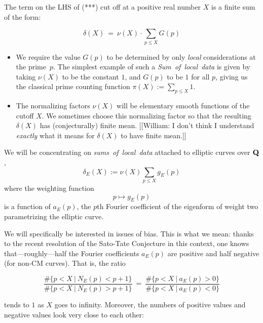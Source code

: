 \documentclass[11pt]{article}
\theoremstyle{plain}
\theoremstyle{definition}
\numberwithin{equation}{section}
\numberwithin{figure}{section}
\numberwithin{table}{section}
\def\Q{\bf{Q}}
\begin{document}
The term on the LHS of {(***)}  cut off at a positive real number $X$ is  a finite sum of the form:

  $$\delta(X) \ = \ \nu(X)\cdot \sum_{p\le X}G(p)$$



  \begin{itemize} \item We require the value $G(p)$ to be determined by only {\it local }considerations at the prime~$p$.
The simplest example of such a {\it Sum\ of\ local\ data}  is given by taking $\nu(X)$ to be the constant $1$, and  $G(p)$ to be  $1$ for all $p$, giving us the classical prime counting function $\pi(X):=\sum_{p\le X}1$. \item The normalizing factors $\nu(X)$ will be elementary smooth functions of the cutoff $X$. We sometimes choose this normalizing factor so that the  resulting  $\delta(X)$ has (conjecturally) finite mean. [[William: I don't think I understand {\em exactly} what it means for $\delta(X)$ to have finite mean.]]

\end{itemize}

We will be concentrating on  {\it sums\ of\ local\ data}  attached to elliptic curves over ${\Q}$,   $$\delta_E(X):=\nu(X)\sum_{p\le X}g_E(p)$$ where the weighting function $$p \mapsto g_E(p)$$   is a function of $a_E(p)$, the $p$th Fourier coefficient of the eigenform of weight two parametrizing the elliptic curve.

  We will specifically be interested in  issues of bias. This is what we mean: thanks to the recent resolution \cite{} of the Sato-Tate Conjecture in this context, one knows that---roughly---half the Fourier coefficients  $a_E(p)$ are positive and half negative (for non-CM curves). That is,  the ratio

 $${\frac{\#\{p < X \ | \ N_E(p) < p+1 \}} {\#\{p < X \ | \ N_E(p) > p+1 \}}}\ =\ {\frac{\#\{p < X \ | \ a_E(p) > 0 \}} {\#\{p < X \ | \ a_E(p) < 0 \}}}$$

 tends to $1$ as $X$ goes to infinity. Moreover, the numbers of positive values and negative values look very close to each other:
\vskip20pt
\end{document}
